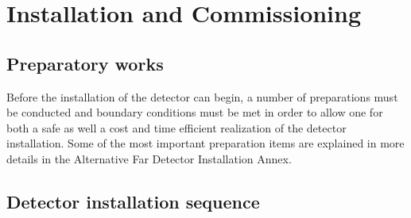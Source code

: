 \section{Installation and Commissioning}
\label{sec:detectors-fd-alt-install}

\subsection{Preparatory works}

Before the installation of the detector can begin, a number of
preparations must be conducted and boundary conditions must be met in
order to allow one for both a safe as well a cost and time efficient
realization of the detector installation. Some of the most important
preparation items are explained in more details in the Alternative Far
Detector Installation Annex.

\subsection{Detector installation sequence}

